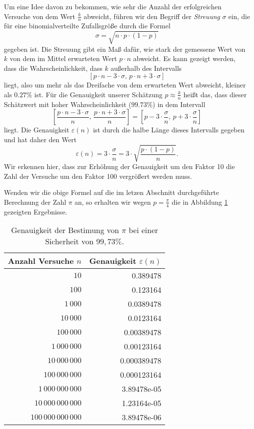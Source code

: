 Um eine Idee davon zu bekommen, wie sehr die Anzahl der erfolgreichen Versuche von dem Wert $\frac{k}{n}$
abweicht,  f\"uhren wir den Begriff der \emph{Streuung} $\sigma$ ein, die f\"ur eine binomialverteilte Zufallsgr\"o{\ss}e
durch die Formel
\[ \sigma = \sqrt{n \cdot p \cdot (1 - p)} \]
gegeben ist.  Die Streuung gibt ein Ma{\ss} daf\"ur, wie stark der gemessene Wert von $k$ von dem im Mittel
erwarteten Wert $p \cdot n$ abweicht.  Es kann gezeigt werden, dass die Wahrscheinlichkeit, dass $k$ au{\ss}erhalb
des Intervalls
\[ [ p \cdot n - 3 \cdot \sigma,\, p \cdot n + 3 \cdot \sigma ] \]
liegt, also um mehr als das Dreifache von dem erwarteten Wert abweicht, kleiner als $0.27 \%$ ist.  F\"ur
 die Genauigkeit unserer Sch\"atzung $p \approx \frac{k}{n}$ hei{\ss}t das, dass dieser Sch\"atzwert mit hoher
 Wahrscheinlichkeit ($99.73\%$) in dem Intervall
\[  \left[ \frac{p \cdot n - 3 \cdot \sigma}{n},\, \frac{p \cdot n + 3 \cdot \sigma}{n} \right] 
  = \left[ p - 3 \cdot \frac{\sigma}{n},\, p + 3 \cdot \frac{\sigma}{n} \right]
\] 
liegt.  Die Genauigkeit $\varepsilon(n)$ ist durch die halbe L\"ange dieses Intervalls gegeben und hat daher den
Wert 
\[ \varepsilon(n) = 3 \cdot \frac{\sigma}{n} = 3 \cdot \sqrt{\frac{p \cdot (1 - p)}{n}}. \]
Wir erkennen hier, dass zur Erh\"ohung der Genauigkeit um den Faktor 10 die Zahl der Versuche um den Faktor 100
vergr\"o{\ss}ert werden muss.

Wenden wir die obige Formel auf die im letzen Abschnitt durchgef\"uhrte Berechnung der Zahl $\pi$ an, so erhalten
wir wegen $p = \frac{\pi}{4}$ die in Abbildung \ref{tab:Precision.java} gezeigten Ergebnisse.

\begin{table}[htbp]
  \centering
  \begin{tabular}[t]{|r|r|}
\hline
Anzahl Versuche $n$ & Genauigkeit $\varepsilon(n)$ \\
\hline
\hline
                $10$ & 0.389478 \\
\hline
               $100$ & 0.123164 \\
\hline
            $1\,000$ & 0.0389478 \\
\hline
           $10\,000$ & 0.0123164 \\
\hline
          $100\,000$ & 0.00389478 \\
\hline
       $1\,000\,000$ & 0.00123164 \\
\hline
      $10\,000\,000$ & 0.000389478 \\
\hline
     $100\,000\,000$ & 0.000123164 \\
\hline
  $1\,000\,000\,000$ & 3.89478e-05 \\
\hline
 $10\,000\,000\,000$ & 1.23164e-05 \\
\hline
$100\,000\,000\,000$ & 3.89478e-06 \\
\hline

  \end{tabular}
  \caption{Genauigkeit der Bestimung von $\pi$ bei einer Sicherheit von $99,73\%$.}
  \label{tab:Precision.java}
\end{table}

